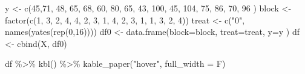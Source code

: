 \documentclass[
]{book}
\newenvironment{Shaded}{\begin{snugshade}}{\end{snugshade}}
\newcommand{\AttributeTok}[1]{\textcolor[rgb]{0.77,0.63,0.00}{#1}}
\newcommand{\DecValTok}[1]{\textcolor[rgb]{0.00,0.00,0.81}{#1}}
\newcommand{\FunctionTok}[1]{\textcolor[rgb]{0.00,0.00,0.00}{#1}}
\newcommand{\NormalTok}[1]{#1}
\newcommand{\OtherTok}[1]{\textcolor[rgb]{0.56,0.35,0.01}{#1}}
\newcommand{\SpecialCharTok}[1]{\textcolor[rgb]{0.00,0.00,0.00}{#1}}
\newcommand{\StringTok}[1]{\textcolor[rgb]{0.31,0.60,0.02}{#1}}
\begin{document}
\begin{Shaded}
\begin{Highlighting}[]
\NormalTok{y }\OtherTok{\textless{}{-}} \FunctionTok{c}\NormalTok{(}\DecValTok{45}\NormalTok{,}\DecValTok{71}\NormalTok{, }\DecValTok{48}\NormalTok{, }\DecValTok{65}\NormalTok{, }\DecValTok{68}\NormalTok{, }\DecValTok{60}\NormalTok{, }\DecValTok{80}\NormalTok{, }\DecValTok{65}\NormalTok{, }\DecValTok{43}\NormalTok{, }\DecValTok{100}\NormalTok{, }\DecValTok{45}\NormalTok{, }\DecValTok{104}\NormalTok{, }\DecValTok{75}\NormalTok{, }\DecValTok{86}\NormalTok{, }\DecValTok{70}\NormalTok{, }\DecValTok{96}\NormalTok{ )}
\NormalTok{block }\OtherTok{\textless{}{-}} \FunctionTok{factor}\NormalTok{(}\FunctionTok{c}\NormalTok{(}\DecValTok{1}\NormalTok{, }\DecValTok{3}\NormalTok{, }\DecValTok{2}\NormalTok{, }\DecValTok{4}\NormalTok{, }\DecValTok{4}\NormalTok{, }\DecValTok{2}\NormalTok{, }\DecValTok{3}\NormalTok{, }\DecValTok{1}\NormalTok{, }\DecValTok{4}\NormalTok{, }\DecValTok{2}\NormalTok{, }\DecValTok{3}\NormalTok{, }\DecValTok{1}\NormalTok{, }\DecValTok{1}\NormalTok{, }\DecValTok{3}\NormalTok{, }\DecValTok{2}\NormalTok{, }\DecValTok{4}\NormalTok{))}
\NormalTok{treat }\OtherTok{\textless{}{-}} \FunctionTok{c}\NormalTok{(}\StringTok{"0"}\NormalTok{, }\FunctionTok{names}\NormalTok{(}\FunctionTok{yates}\NormalTok{(}\FunctionTok{rep}\NormalTok{(}\DecValTok{0}\NormalTok{,}\DecValTok{16}\NormalTok{))))}
\NormalTok{df0 }\OtherTok{\textless{}{-}} \FunctionTok{data.frame}\NormalTok{(}\AttributeTok{block=}\NormalTok{block, }\AttributeTok{treat=}\NormalTok{treat,  }\AttributeTok{y=}\NormalTok{y )}
\NormalTok{df }\OtherTok{\textless{}{-}} \FunctionTok{cbind}\NormalTok{(X, df0)}
\end{Highlighting}
\end{Shaded}

\begin{Shaded}
\begin{Highlighting}[]
\NormalTok{df }\SpecialCharTok{\%\textgreater{}\%}  \FunctionTok{kbl}\NormalTok{() }\SpecialCharTok{\%\textgreater{}\%}   \FunctionTok{kable\_paper}\NormalTok{(}\StringTok{"hover"}\NormalTok{, }\AttributeTok{full\_width =}\NormalTok{ F)}
\end{Highlighting}
\end{Shaded}
\end{document}
